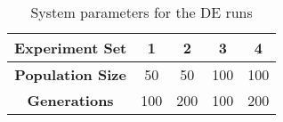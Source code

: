 \begin{table}
	\centering
	\begin{tabular}{ | >{\bfseries}c | c | c | c | c | }
		\hline
		Experiment Set & 1 & 2 & 3 & 4 \\ \hline
		Population Size & 50 & 50 & 100 & 100 \\ \hline
		Generations & 100 & 200 & 100 & 200 \\ \hline
	\end{tabular}
	\caption{System parameters for the DE runs}
	\label{table:ea-de}
\end{table}

